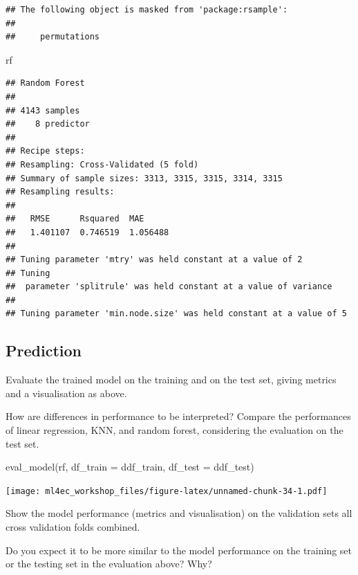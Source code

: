 \documentclass[
]{book}
\newenvironment{Shaded}{\begin{snugshade}}{\end{snugshade}}
\newcommand{\AttributeTok}[1]{\textcolor[rgb]{0.77,0.63,0.00}{#1}}
\newcommand{\FunctionTok}[1]{\textcolor[rgb]{0.00,0.00,0.00}{#1}}
\newcommand{\NormalTok}[1]{#1}
\begin{document}
\begin{verbatim}
## The following object is masked from 'package:rsample':
## 
##     permutations
\end{verbatim}

\begin{Shaded}
\begin{Highlighting}[]
\NormalTok{rf}
\end{Highlighting}
\end{Shaded}

\begin{verbatim}
## Random Forest 
## 
## 4143 samples
##    8 predictor
## 
## Recipe steps:  
## Resampling: Cross-Validated (5 fold) 
## Summary of sample sizes: 3313, 3315, 3315, 3314, 3315 
## Resampling results:
## 
##   RMSE      Rsquared  MAE     
##   1.401107  0.746519  1.056488
## 
## Tuning parameter 'mtry' was held constant at a value of 2
## Tuning
##  parameter 'splitrule' was held constant at a value of variance
## 
## Tuning parameter 'min.node.size' was held constant at a value of 5
\end{verbatim}

\hypertarget{prediction-2}{%
\subsection{Prediction}\label{prediction-2}}

Evaluate the trained model on the training and on the test set, giving metrics and a visualisation as above.

How are differences in performance to be interpreted? Compare the performances of linear regression, KNN, and random forest, considering the evaluation on the test set.

\begin{Shaded}
\begin{Highlighting}[]
\FunctionTok{eval\_model}\NormalTok{(rf, }\AttributeTok{df\_train =}\NormalTok{ ddf\_train, }\AttributeTok{df\_test =}\NormalTok{ ddf\_test)}
\end{Highlighting}
\end{Shaded}

\texttt{[image: ml4ec\_workshop\_files/figure-latex/unnamed-chunk-34-1.pdf]}

Show the model performance (metrics and visualisation) on the validation sets all cross validation folds combined.

Do you expect it to be more similar to the model performance on the training set or the testing set in the evaluation above? Why?
\end{document}
